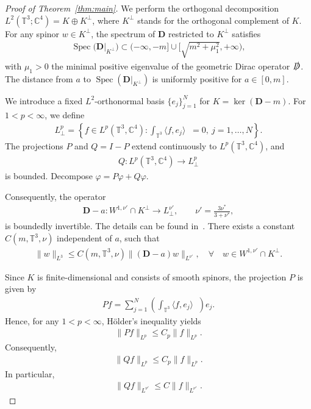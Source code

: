 \documentclass[11pt,final]{amsart}
\newcommand{\C}{\mathbb{C}}
\newcommand{\T}{\mathbb{T}}
\newcommand{\dd}{\mathop{}\!\mathrm{d}}
\newcommand{\D}{\slashed{D}}
\newcommand{\pD}{\mathbf{D}}
\DeclareMathOperator{\dv}{\dd{vol}}
\begin{document}
\begin{proof}[Proof of Theorem~\ref{thm:main}]

We perform the orthogonal decomposition $L^2(\T^3;\mathbb{C}^4) = K \oplus K^\perp$, where $K^\perp$ stands for the orthogonal complement of $K$. For any spinor $w\in K^\perp$, the spectrum of $\pD$ restricted to $K^\perp$ satisfies
\begin{align}
\operatorname{Spec}\big(\pD\big|_{K^\perp}\big) \subset (-\infty,-m] \cup \big[\sqrt{m^2+\mu_1^2},+\infty\big),
\end{align}
with $\mu_1>0$ the minimal positive eigenvalue of the geometric Dirac operator $\D$. The distance from $a$ to $\operatorname{Spec}(\pD|_{K^\perp})$ is uniformly positive for $a\in[0,m]$. 



We introduce a fixed $L^2$-orthonormal basis $\{e_j\}_{j=1}^N$ for $K=\ker(\pD-m)$. For $1<p<\infty$, we define
\begin{align}
L^p_\perp
=
\left\{
f\in L^p(\T^3,\C^4):
\int_{\T^3}\langle f,e_j\rangle \dv=0,
\ j=1,\dots,N
\right\}.
\end{align}
The projections $P$ and $Q=I-P$ extend continuously to $L^p(\T^3,\C^4)$, and
\begin{align}
Q:L^p(\T^3,\C^4)\rightarrow L^p_\perp
\end{align}
is bounded. Decompose $\varphi = P\varphi+ Q\varphi$.

Consequently, the operator
\begin{align}
\pD - a: W^{1, \nu'}\cap K^\perp \to L^{ \nu'}_\perp,\qquad  \nu'=\frac{3\nu^*}{3+\nu^*},
\end{align}
is boundedly invertible. The details can be found in~\cite[Lemma 5.5]{WZ2026Stationary}. There exists a constant $C(m,\mathbb{T}^3,\nu)$ independent of $a$, such that
\begin{align}\label{eq:uniform-resolvent}
\|w\|_{L^3} \le C(m,\mathbb{T}^3,\nu) \big\|(\pD - a)w\big\|_{L^{ \nu'}},\quad \forall \quad w\in W^{1, \nu'}\cap K^\perp.
\end{align}



Since $K$ is finite-dimensional and consists of smooth spinors, the projection $P$ is given by
\begin{align}
Pf=\sum_{j=1}^N \left(\int_{\T^3}
\langle f,e_j\rangle\dv\right)e_j.
\end{align}
Hence, for any $1<p<\infty$, H\"{o}lder's inequality yields
\begin{align}
\|Pf\|_{L^p}\le C_p\|f\|_{L^p}.
\end{align}
Consequently,
\begin{align}
\|Qf\|_{L^p}\le C_p\|f\|_{L^p}.
\end{align}
In particular,
\begin{align}
\|Qf\|_{L^{\nu'}}\le C\|f\|_{L^{\nu'}}.
\end{align}


\end{proof}
\end{document}
